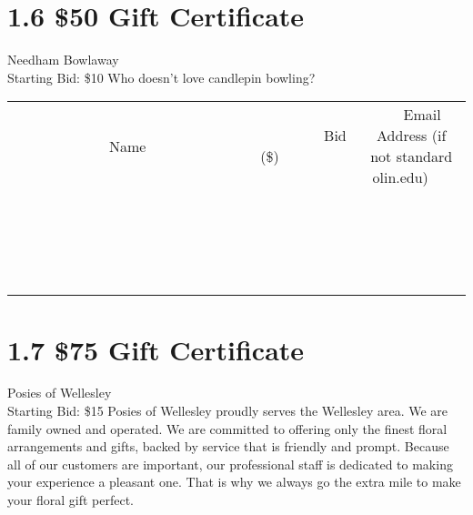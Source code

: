 \documentclass[11pt]{article}
\begin{document}
\section*{1.6 \$50 Gift Certificate}
Needham Bowlaway
\\
Starting Bid: \$10
\newline
Who doesn't love candlepin bowling?
\\[3ex]
\begin{tabular}{c c c}
~~~~~~~~~~~~~Name~~~~~~~~~~~~~ & ~~~~~~~~~Bid (\$)~~~~~~~~~  & ~~~Email Address (if not standard olin.edu)~~~\\
 & & \\
\hline
 & & \\
\hline
 & & \\
\hline
 & & \\
\hline
 & & \\
\hline
 & & \\
\hline
 & & \\
\hline
 & & \\
\hline
 & & \\
\hline
 & & \\
\hline
 & & \\
\hline
 & & \\
\hline
 & & \\
\hline
 & & \\
\hline
 & & \\
\hline
 & & \\
\hline
 & & \\
\hline
 & & \\
\hline
 & & \\
\hline
\end{tabular}
\newpage
\section*{1.7 \$75 Gift Certificate}
Posies of Wellesley
\\
Starting Bid: \$15
\newline
Posies of Wellesley proudly serves the Wellesley area. We are family owned and operated. We are committed to offering only the finest floral arrangements and gifts, backed by service that is friendly and prompt. Because all of our customers are important, our professional staff is dedicated to making your experience a pleasant one. That is why we always go the extra mile to make your floral gift perfect.
\end{document}
